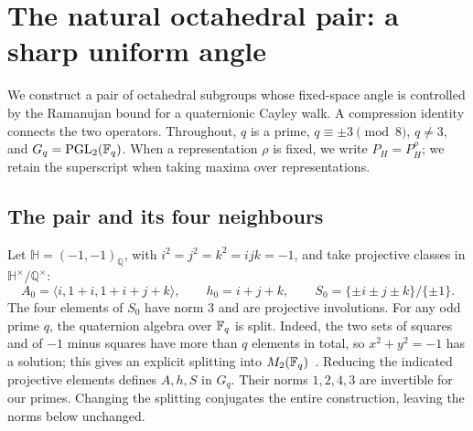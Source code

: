 \section{The natural octahedral pair: a sharp uniform angle}
\label{sec:octahedral-pair}

We construct a pair of octahedral subgroups whose fixed-space angle is
controlled by the Ramanujan bound for a quaternionic Cayley walk.
A compression identity connects the two operators. Throughout, $q$ is a prime,
$q\equiv\pm3\pmod8$, $q\ne3$, and $G_q=\operatorname{PGL}_2(\mathbb{F}_q)$.
When a representation $\rho$ is fixed, we write $P_H=P_H^\rho$;
we retain the superscript when taking maxima over representations.

\subsection{The pair and its four neighbours}
Let $\mathbb H=(-1,-1)_{\mathbb Q}$, with $i^2=j^2=k^2=ijk=-1$,
and take projective classes in $\mathbb H^\times/\mathbb Q^\times$:
\[
 A_0=\langle i,1+i,1+i+j+k\rangle,\qquad h_0=i+j+k,
 \qquad S_0=\{\pm i\pm j\pm k\}/\{\pm1\}.
\]
The four elements of $S_0$ have norm $3$ and are projective involutions.
For any odd prime $q$, the quaternion algebra over $\mathbb{F}_q$ is split.
Indeed, the two sets of squares and of $-1$ minus squares have more
than $q$ elements in total, so $x^2+y^2=-1$ has a solution; this gives
an explicit splitting into $M_2(\mathbb{F}_q)$~\cite[Proposition 2.5.2]{DSV2003}.
Reducing the indicated projective elements defines $A,h,S$ in $G_q$.
Their norms $1,2,4,3$ are invertible for our primes. Changing the splitting
conjugates the entire construction, leaving the norms below unchanged.


